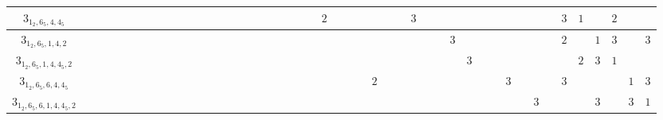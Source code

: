 \documentclass{amsart}
\theoremstyle{definition}
\theoremstyle{remark}
\begin{document}
\begin{table}
{\begin{tabular}{|c||c|c|c|c|c|c|c|c|c|c|c|c|c|c|c|c|c|c|c|c|c|c|c|c|c|c|c|c|c|c|c|c|c|c|c|c|c|c|c|c|c|c|c|c|c|}
$3_{1_2,6_5,4,4_5}$ & & & & & & & & & & & & & & & & & & & & & & $2$ & & & & & & & $3$ & & & & & & & & & & & $3$ & $1$ & & $2$ & & \\ \hline
$3_{1_2,6_5,1,4,2}$ & & & & & & & & & & & & & & & & & & & & & & & & & & & & & & & & $3$ & & & & & & & & $2$ & & $1$ & $3$ & & $3$ \\ \hline
$3_{1_2,6_5,1,4,4_5,2}$ & & & & & & & & & & & & & & & & & & & & & & & & & & & & & & & & & $3$ & & & & & & & & $2$ & $3$ & $1$ & & \\ \hline
$3_{1_2,6_5,6,4,4_5}$ & & & & & & & & & & & & & & & & & & & & & & & & & & $2$ & & & & & & & & & & $3$ & & & & $3$ & & & & $1$ & $3$ \\ \hline
$3_{1_2,6_5,6,1,4,4_5,2}$ & & & & & & & & & & & & & & & & & & & & & & & & & & & & & & & & & & & & & & $3$ & & & & $3$ & & $3$ & $1$ \\ \hline
\end{tabular}
}

\vspace{20pt}


\end{table}
\end{document}
